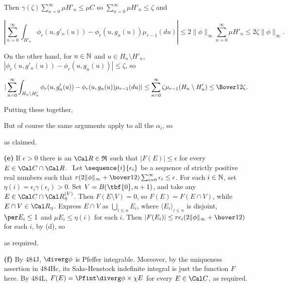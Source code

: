 {

\noindent Then $\gamma(\zeta)\sum_{n=0}^{\infty}\mu H'_n\le\mu C$ so
$\sum_{n=0}^{\infty}\mu H'_n\le\zeta$ and

$$|\sum_{n=0}^{\infty}\int_{H'_n}
  \phi_r(u,g'_n(u))-\phi_r(u,g_n(u))\mu_{r-1}(du)|
\le 2\|\phi\|_{\infty}\sum_{n=0}^{\infty}\mu H'_n
\le 2\zeta\|\phi\|_{\infty}.$$

\noindent On the other hand, for $n\in\Bbb N$ and
$u\in H_n\setminus H'_n$,
$|\phi_r(u,g'_n(u))-\phi_r(u,g_n(u))|\le\zeta$, so

$$|\sum_{n=0}^{\infty}\int_{H_n\setminus H'_n}
  \phi_r(u,g'_n(u))-\phi_r(u,g_n(u))\mu_{r-1}(du)|
\le\sum_{n=0}^{\infty}\zeta\mu_{r-1}(H_n\setminus H'_n)
\le\Bover12\zeta.$$

\noindent Putting these together,


\noindent But of course the same arguments apply to all the $\alpha_i$,
so


\noindent as claimed.\ \Qed

\medskip

{\bf (e)} If $\epsilon>0$ there is an $\Cal R\in\frak R$ such that
$|F(E)|\le\epsilon$ for every $E\in\Cal C\cap\Cal R$.   \Prf\ Let
$\sequence{i}{\epsilon_i}$ be a sequence of strictly positive real
numbers such that
$r(2\|\phi\|_{\infty}+\bover12)\sum_{i=0}^{\infty}\epsilon_i
\le\epsilon$.
For each $i\in\Bbb N$, set $\eta(i)=\epsilon_i\gamma(\epsilon_i)>0$.
Set $V=B(\tbf{0},n+1)$, and take any
$E\in\Cal C\cap\Cal R^{(V)}_{\eta}$.   Then $F(E\setminus V)=0$, so
$F(E)=F(E\cap V)$, while $E\cap V\in\Cal R_{\eta}$.   Express $E\cap V$
as $\bigcup_{i\le n}E_i$, where $\langle E_i\rangle_{i\le n}$ is
disjoint, $\per E_i\le 1$ and $\mu E_i\le\eta(i)$ for each $i$.
Then $|F(E_i)|\le r\epsilon_i(2\|\phi\|_{\infty}+\bover12)$ for each
$i$, by (d), so


\noindent as required.\ \Qed

\medskip

{\bf (f)} By 484J, $\diverg\phi$ is Pfeffer integrable.   Moreover, by
the uniqueness assertion in 484Hc, its Saks-Henstock indefinite integral
is just the function $F$ here.   By 484L,
$F(E)=\Pfint\diverg\phi\times\chi E$ for every $E\in\Cal C$, as required.
}%

